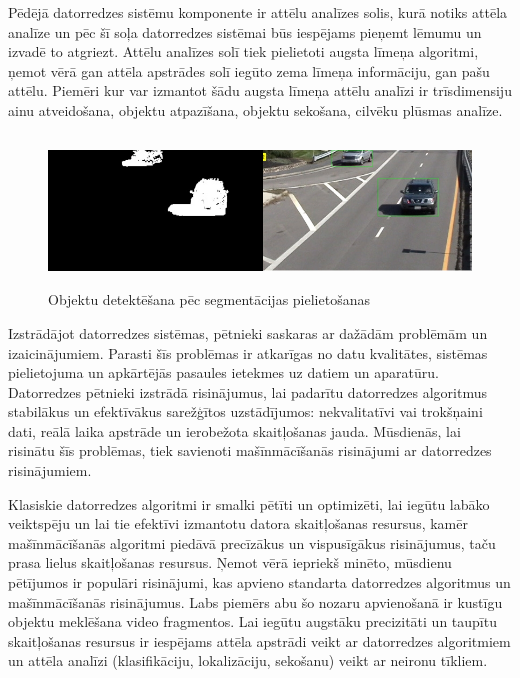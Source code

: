 Pēdējā datorredzes sistēmu komponente ir attēlu analīzes solis, kurā notiks attēla analīze un pēc šī soļa datorredzes sistēmai būs iespējams pieņemt lēmumu un izvadē to atgriezt. Attēlu analīzes solī tiek pielietoti augsta līmeņa algoritmi, ņemot vērā gan attēla apstrādes solī iegūto zema līmeņa informāciju, gan pašu attēlu. Piemēri kur var izmantot šādu augsta līmeņa attēlu analīzi ir trīsdimensiju ainu atveidošana, objektu atpazīšana, objektu sekošana, cilvēku plūsmas analīze.
\begin{figure}[h]%
	\centering
	\includegraphics[height=4cm]{images/computervision3.png} %
	\caption{Objektu detektēšana pēc segmentācijas pielietošanas \cite{compv2}}%
	\label{fig:example}%
\end{figure} 

Izstrādājot datorredzes sistēmas, pētnieki saskaras ar dažādām problēmām un izaicinājumiem. Parasti šīs problēmas ir atkarīgas no datu kvalitātes, sistēmas pielietojuma un apkārtējās pasaules ietekmes uz datiem un aparatūru. Datorredzes pētnieki izstrādā risinājumus, lai padarītu datorredzes algoritmus stabilākus un efektīvākus sarežģītos uzstādījumos: nekvalitatīvi vai trokšņaini dati, reālā laika apstrāde un ierobežota skaitļošanas jauda. Mūsdienās, lai risinātu šīs problēmas, tiek savienoti mašīnmācīšanās risinājumi ar datorredzes risinājumiem.

Klasiskie datorredzes algoritmi ir smalki pētīti un optimizēti, lai iegūtu labāko veiktspēju un lai tie efektīvi izmantotu datora skaitļošanas resursus, kamēr mašīnmācīšanās algoritmi piedāvā precīzākus un vispusīgākus risinājumus, taču prasa lielus skaitļošanas resursus. Ņemot vērā iepriekš minēto, mūsdienu pētījumos ir populāri risinājumi, kas apvieno standarta datorredzes algoritmus un mašīnmācīšanās risinājumus. Labs piemērs abu šo nozaru apvienošanā ir kustīgu objektu meklēšana video fragmentos. Lai iegūtu augstāku precizitāti un taupītu skaitļošanas resursus ir iespējams attēla apstrādi veikt ar datorredzes algoritmiem un attēla analīzi (klasifikāciju, lokalizāciju, sekošanu) veikt ar neironu tīkliem.



